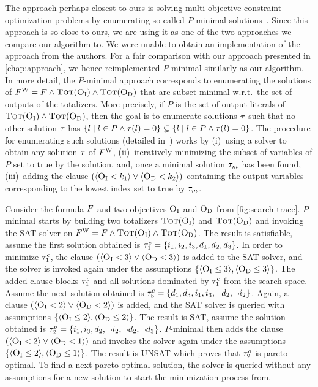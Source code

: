 The approach perhaps closest to ours is solving multi-objective constraint optimization problems by enumerating so-called $P$-minimal solutions~\autocite{DBLP:conf/cp/SohBTB17,DBLP:conf/ftp/KoshimuraNFH09}.
Since this approach is so close to ours, we are using it as one of the two approaches we compare our algorithm to.
We were unable to obtain an implementation of the approach from the authors.
For a fair comparison with our approach presented in \cref{chap:approach}, we hence reimplemented $P$-minimal similarly as our algorithm.
In more detail, the $P$-minimal approach  corresponds to enumerating the solutions of $F^\text{W} = F \land \textsc{Tot}(\textsc{O}_{\text{I}}) \land \textsc{Tot}(\textsc{O}_{\text{D}})$ that are subset-minimal w.r.t.\ the set of outputs of the totalizers.
More precisely, if $P$ is the set of output literals of $\textsc{Tot}(\textsc{O}_{\text{I}}) \land \textsc{Tot}(\textsc{O}_{\text{D}})$, then the goal is to enumerate solutions $\tau$ such that no other solution $\tau$ has $\{ l \mid l \in P \land \tau(l) = 0\} \subsetneq \{ l \mid l \in P \land \tau(l) = 0\}$.
The procedure for enumerating such solutions (detailed in~\textcite{DBLP:conf/ftp/KoshimuraNFH09}) works by (i)~using a solver to obtain any solution $\tau$ of $F^\text{W}$, (ii)~iteratively minimizing the subset of variables of $P$ set to true by the solution, and, once a minimal solution $\tau_m$ has been found, (iii)~adding the clause $(\langle \textsc{O}_{\text{I}} < k_1 \rangle \lor \langle \textsc{O}_{\text{D}} < k_2 \rangle)$ containing the output variables corresponding to the lowest index set to true by $\tau_m$.

\begin{example}\label{ex:pmin}
  Consider the formula $F$ and two objectives $\textsc{O}_{\text{I}}$ and $\textsc{O}_{\text{D}}$ from \cref{fig:search-trace}.
  $P$-minimal starts by building two totalizers $\textsc{Tot}(\textsc{O}_{\text{I}})$ and $\textsc{Tot}(\textsc{O}_{\text{D}})$ and invoking the SAT solver on $F^\text{W} = F \land \textsc{Tot}(\textsc{O}_{\text{I}}) \land \textsc{Tot}(\textsc{O}_{\text{D}})$.
  The result is satisfiable, assume the first solution obtained is $\tau^c_1 = \{i_1, i_2, i_3, d_1, d_2, d_3\}$. 
  In order to minimize $\tau^c_1$, the clause $(\langle \textsc{O}_{\text{I}} < 3 \rangle \lor \langle \textsc{O}_{\text{D}} < 3 \rangle)$ is added to the SAT solver, and the solver is invoked again under the assumptions $\{ \langle \textsc{O}_{\text{I}} \leq 3 \rangle, \langle \textsc{O}_{\text{D}} \leq 3 \rangle \}$.
  The added clause blocks $\tau^c_1$ and all solutions dominated by $\tau^c_1$ from the search space.
  Assume the next solution obtained is $\tau^c_5 = \{d_1, d_3, i_1, i_3, \lnot d_2, \lnot i_2\}$. 
  Again, a clause $(\langle \textsc{O}_{\text{I}} < 2 \rangle \lor \langle \textsc{O}_{\text{D}} < 2 \rangle)$ is added, and the SAT solver is queried with assumptions $\{ \langle \textsc{O}_{\text{I}} \leq 2 \rangle, \langle \textsc{O}_{\text{D}} \leq 2 \rangle \}$.
  The result is SAT, assume the solution obtained is $\tau^o_2 = \{ i_1, i_3, d_2, \lnot i_2, \lnot d_2, \lnot d_3\}$. 
  $P$-minimal then adds the clause $(\langle \textsc{O}_{\text{I}} < 2 \rangle \lor \langle \textsc{O}_{\text{D}} < 1 \rangle)$ and invokes the solver again under the assumptions $\{ \langle \textsc{O}_{\text{I}} \leq 2 \rangle, \langle \textsc{O}_{\text{D}} \leq 1 \rangle \}$.
  The result is UNSAT which proves that $\tau^o_2$ is pareto-optimal. 
  To find a next pareto-optimal solution, the solver is queried without any assumptions for a new solution to start the minimization process from.
\end{example}

